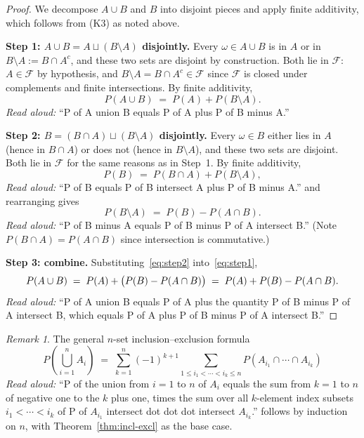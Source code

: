 \documentclass[11pt]{article}
\theoremstyle{definition}
\theoremstyle{remark}
\newtheorem{remark}[theorem]{Remark}
\newcommand{\F}{\mathcal{F}}
\begin{document}
\begin{proof}
We decompose $A \cup B$ and $B$ into disjoint pieces and apply finite additivity,
which follows from (K3) as noted above.

\smallskip
\textbf{Step 1: $A \cup B = A \sqcup (B \setminus A)$ disjointly.}
Every $\omega \in A \cup B$ is in $A$ or in $B \setminus A := B \cap A^c$, and these
two sets are disjoint by construction. Both lie in $\F$: $A \in \F$ by hypothesis,
and $B \setminus A = B \cap A^c \in \F$ since $\F$ is closed under complements and
finite intersections. By finite additivity,
\begin{equation}\label{eq:step1}
    P(A \cup B) \;=\; P(A) + P(B \setminus A).
\end{equation}
\emph{Read aloud:} ``P of A union B equals P of A plus P of B minus A.''

\smallskip
\textbf{Step 2: $B = (B \cap A) \sqcup (B \setminus A)$ disjointly.}
Every $\omega \in B$ either lies in $A$ (hence in $B \cap A$) or does not (hence in
$B \setminus A$), and these two sets are disjoint. Both lie in $\F$ for the same
reasons as in Step~1. By finite additivity,
\[
    P(B) \;=\; P(B \cap A) + P(B \setminus A),
\]
\emph{Read aloud:} ``P of B equals P of B intersect A plus P of B minus A.''
and rearranging gives
\begin{equation}\label{eq:step2}
    P(B \setminus A) \;=\; P(B) - P(A \cap B).
\end{equation}
\emph{Read aloud:} ``P of B minus A equals P of B minus P of A intersect B.''
(Note $P(B \cap A) = P(A \cap B)$ since intersection is commutative.)

\smallskip
\textbf{Step 3: combine.} Substituting~\eqref{eq:step2} into~\eqref{eq:step1},
\[
    P(A \cup B) \;=\; P(A) + \bigl( P(B) - P(A \cap B) \bigr)
                \;=\; P(A) + P(B) - P(A \cap B). \qedhere
\]
\emph{Read aloud:} ``P of A union B equals P of A plus the quantity P of B minus P of A intersect B, which equals P of A plus P of B minus P of A intersect B.''
\end{proof}

\begin{remark}
The general $n$-set inclusion--exclusion formula
\[
    P\!\left( \bigcup_{i=1}^{n} A_i \right)
    \;=\; \sum_{k=1}^{n} (-1)^{k+1} \!\!\!
            \sum_{1 \leq i_1 < \cdots < i_k \leq n} \!\!\! P(A_{i_1} \cap \cdots \cap A_{i_k})
\]
\emph{Read aloud:} ``P of the union from $i=1$ to $n$ of $A_i$ equals the sum from $k=1$ to $n$ of negative one to the $k$ plus one, times the sum over all $k$-element index subsets $i_1 < \cdots < i_k$ of P of $A_{i_1}$ intersect dot dot dot intersect $A_{i_k}$.''
follows by induction on $n$, with Theorem~\ref{thm:incl-excl} as the base case.
\end{remark}
\end{document}

